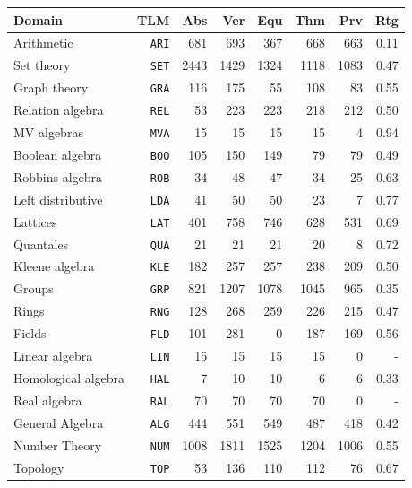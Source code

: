 \documentclass[runningheads]{llncs}
\begin{document}
\begin{table}[htb]
\begin{center}
\setlength{\tabcolsep}{4pt}
\begin{tabular}{lr|rr|rrrr}
Domain              & TLM       & Abs  & Ver  & Equ  & Thm  & Prv  & Rtg \\
\hline
Arithmetic          & {\tt ARI} &  681 &  693 &  367 &  668 &  663 & 0.11 \\
Set theory          & {\tt SET} & 2443 & 1429 & 1324 & 1118 & 1083 & 0.47 \\
Graph theory        & {\tt GRA} &  116 &  175 &   55 &  108 &   83 & 0.55 \\
Relation algebra    & {\tt REL} &   53 &  223 &  223 &  218 &  212 & 0.50 \\
MV algebras         & {\tt MVA} &   15 &   15 &   15 &   15 &    4 & 0.94 \\
Boolean algebra     & {\tt BOO} &  105 &  150 &  149 &   79 &   79 & 0.49 \\
Robbins algebra     & {\tt ROB} &   34 &   48 &   47 &   34 &   25 & 0.63 \\
Left distributive   & {\tt LDA} &   41 &   50 &   50 &   23 &    7 & 0.77 \\
Lattices            & {\tt LAT} &  401 &  758 &  746 &  628 &  531 & 0.69 \\
Quantales           & {\tt QUA} &   21 &   21 &   21 &   20 &    8 & 0.72 \\
Kleene algebra      & {\tt KLE} &  182 &  257 &  257 &  238 &  209 & 0.50 \\
Groups              & {\tt GRP} &  821 & 1207 & 1078 & 1045 &  965 & 0.35 \\
Rings               & {\tt RNG} &  128 &  268 &  259 &  226 &  215 & 0.47 \\
Fields              & {\tt FLD} &  101 &  281 &    0 &  187 &  169 & 0.56 \\
Linear algebra      & {\tt LIN} &   15 &   15 &   15 &   15 &    0 & -    \\
Homological algebra & {\tt HAL} &    7 &   10 &   10 &    6 &    6 & 0.33 \\
Real algebra        & {\tt RAL} &   70 &   70 &   70 &   70 &    0 & -    \\
General Algebra     & {\tt ALG} &  444 &  551 &  549 &  487 &  418 & 0.42 \\
Number Theory       & {\tt NUM} & 1008 & 1811 & 1525 & 1204 & 1006 & 0.55 \\
Topology            & {\tt TOP} &   53 &  136 &  110 &  112 &   76 & 0.67 \\

\end{tabular}
\end{center}
\end{table}
\end{document}
